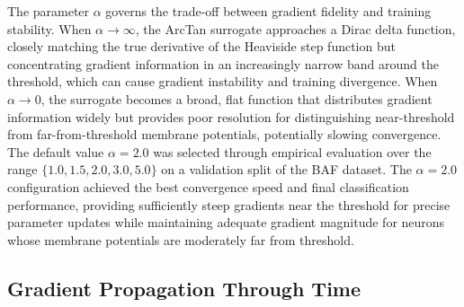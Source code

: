 The parameter $\alpha$ governs the trade-off between gradient fidelity and training stability. When $\alpha \to \infty$, the ArcTan surrogate approaches a Dirac delta function, closely matching the true derivative of the Heaviside step function but concentrating gradient information in an increasingly narrow band around the threshold, which can cause gradient instability and training divergence. When $\alpha \to 0$, the surrogate becomes a broad, flat function that distributes gradient information widely but provides poor resolution for distinguishing near-threshold from far-from-threshold membrane potentials, potentially slowing convergence. The default value $\alpha = 2.0$ was selected through empirical evaluation over the range $\{1.0, 1.5, 2.0, 3.0, 5.0\}$ on a validation split of the BAF dataset. The $\alpha = 2.0$ configuration achieved the best convergence speed and final classification performance, providing sufficiently steep gradients near the threshold for precise parameter updates while maintaining adequate gradient magnitude for neurons whose membrane potentials are moderately far from threshold.

\subsection{Gradient Propagation Through Time}

